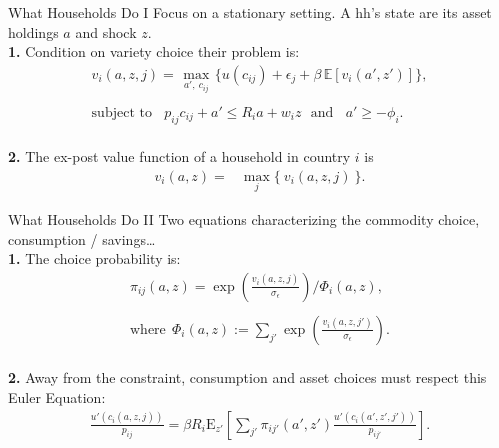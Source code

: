 \documentclass[9pt,pdftex,aspectratio=1610]{beamer}
\theoremstyle{definition}
\begin{document}

\begin{frame}[t]{What Households Do I}
\smallskip
Focus on a stationary setting. A hh's state are its asset holdings $a$ and shock $z$.\\
\bigskip
\textbf{1.} Condition on variety choice their problem is:
\begin{align}
v_{i}(a, z, j) =   \max_{\ a', \ c_{ij}  \ }\bigg  \{ u(c_{ij}) + \epsilon_{j}  + \beta \, \mathbb{E} [v_{i}(a', z')]  \bigg\}, \nonumber \\
\nonumber \\
\mbox{subject to}  \ \ \  \  p_{ij}c_{ij} +  a' \leq    R_{i} a + w_{i} z \ \ \  \mbox{and} \ \ \ \ a' \geq - \phi_{i}. \nonumber
\end{align}\\
\bigskip
\medskip
\textbf{2.} The ex-post value function of a household in country $i$ is
\begin{align}
v_{i}(a, z) = &  \max_{j} \big  \{ \  v_{i}(a, z, j)  \ \big \}. \nonumber
\end{align}
\end{frame}


\begin{frame}[t]{What Households Do II}
\smallskip
Two equations characterizing the commodity choice, consumption / savings\ldots\\
\medskip
\textbf{1.} The choice probability is:
\begin{align*}
\pi_{ij}(a, z) = \exp \left( \frac{ v_{i}(a, z, j) }{\sigma_{\epsilon}} \right) \Bigg / \Phi_{i}(a,z) ,\\
\\
\mbox{where} \ \ \Phi_{i}(a,z) := \sum_{j'} \exp \left( \frac{ v_{i}(a, z, j') }{\sigma_{\epsilon}}  \right).
\end{align*}\\
\bigskip
\medskip
\textbf{2.} Away from the constraint, consumption and asset choices must respect this Euler Equation:
\begin{align*}
\frac{u'(c_{i}(a, z, j))}{p_{ij}} = \beta R_{i} \mathrm{E}_{z'} \left[ \sum_{j'} \pi_{ij'}(a', z') \frac{u'(c_{i}(a', z', j'))}{p_{ij'}} \right].
\end{align*}
\end{frame}
\end{document}
